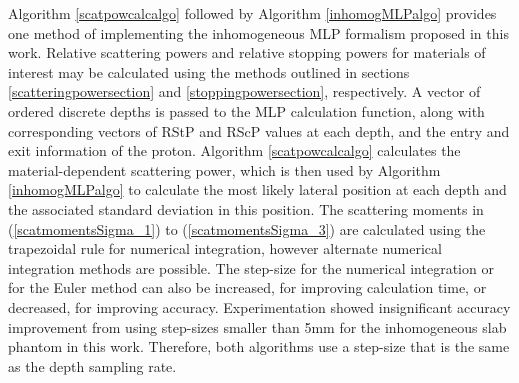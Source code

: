 \documentclass[preprint,times]{elsarticle}
\begin{document}
Algorithm \ref{scatpowcalcalgo} followed by Algorithm \ref{inhomogMLPalgo} provides one method of implementing the inhomogeneous MLP formalism proposed in this work. Relative scattering powers and relative stopping powers for materials of interest may be calculated using the methods outlined in sections \ref{scatteringpowersection} and \ref{stoppingpowersection}, respectively. A vector of ordered discrete depths is passed to the MLP calculation function, along with corresponding vectors of RStP and RScP values at each depth, and the entry and exit information of the proton. Algorithm \ref{scatpowcalcalgo} calculates the material-dependent scattering power, which is then used by Algorithm \ref{inhomogMLPalgo} to calculate the most likely lateral position at each depth and the associated standard deviation in this position. The scattering moments in (\ref{scatmomentsSigma_1}) to (\ref{scatmomentsSigma_3}) are calculated using the trapezoidal rule for numerical integration, however alternate numerical integration methods are possible. The step-size for the numerical integration or for the Euler method can also be increased, for improving calculation time, or decreased, for improving accuracy. Experimentation showed insignificant accuracy improvement from using step-sizes smaller than 5mm for the inhomogeneous slab phantom in this work. Therefore, both algorithms use a step-size that is the same as the depth sampling rate.
\end{document}
